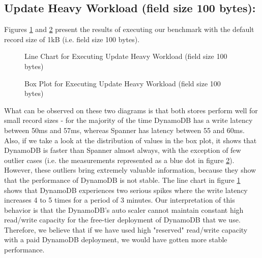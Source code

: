\documentclass[letterpaper, 10 pt, conference]{ieeeconf}  %
\begin{document}
\subsection{Update Heavy Workload (field size 100 bytes):}
Figures \ref{fig:workloadA_size100} and \ref{fig:boxplot_size100} present the results of executing our benchmark with the default record size of 1kB (i.e. field size 100 bytes).
\begin{figure}[h]
\centering
{}
\caption{Line Chart for Executing Update Heavy Workload (field size 100 bytes)}
\label{fig:workloadA_size100}
\end{figure}  
 
\begin{figure}[h]
\centering
{}
\caption{Box Plot for Executing Update Heavy Workload (field size 100 bytes)}
\label{fig:boxplot_size100}
\end{figure} 
What can be observed on these two diagrams is that both stores perform well for small record sizes - for the majority of the time DynamoDB has a write latency between 50ms and 57ms, whereas Spanner has latency between 55 and 60ms. Also, if we take a look at the distribution of values in the box plot, it shows that DynamoDB is faster than Spanner almost always, with the exception of few outlier cases (i.e. the measurements represented as a blue dot in figure \ref{fig:boxplot_size100}). However, these outliers bring extremely valuable information, because they show that the performance of DynamoDB is not stable. The line chart in figure \ref{fig:workloadA_size100} shows that DynamoDB experiences two serious spikes where the write latency increases 4 to 5 times for a period of 3 minutes. Our interpretation of this behavior is that the DynamoDB's auto scaler cannot maintain constant high read/write capacity for the free-tier deployment of DynamoDB that we use. Therefore, we believe that if we have used high "reserved" read/write capacity with a paid DynamoDB deployment, we would have gotten more stable performance.
\end{document}
